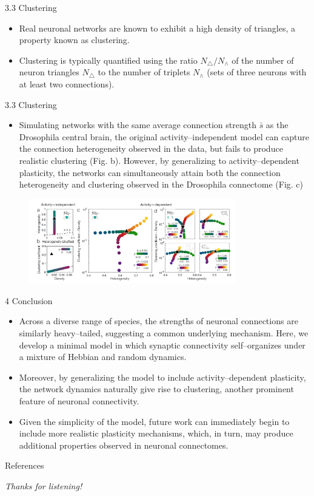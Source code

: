 \documentclass[
  notheorems,
  aspectratio=54,
]{beamer}
\begin{document}
\begin{frame}{3.3 Clustering}
  \begin{itemize}
    \item Real neuronal networks are known to exhibit a high density of triangles, a property known as clustering.
    \item Clustering is typically quantified using the ratio $N_{\triangle}/N_{\wedge}$ of the number of neuron triangles $N_{\triangle}$ to the
number of triplets $N_{\wedge}$ (sets of three neurons with at least two connections).
  \end{itemize}
\end{frame}

\begin{frame}{3.3 Clustering}
  \begin{itemize}
    \item Simulating
      networks with the same average connection strength $\bar{s}$ as the Drosophila central brain, the original
activity–independent model can capture the connection heterogeneity observed in the data, but fails to produce realistic clustering (Fig. b). However,
by generalizing to activity–dependent plasticity, the networks can simultaneously attain both the
connection heterogeneity and clustering observed in the Drosophila connectome (Fig. c)
  \end{itemize}
  \begin{figure}
    \centering
    \includegraphics[width=0.8\textwidth]{./screenshot/10.png}
  \end{figure}
\end{frame}

\begin{frame}{4 Conclusion}
  \begin{itemize}
    \item Across a diverse range of species, the strengths of neuronal connections are similarly heavy–tailed, suggesting a common underlying mechanism. Here, we develop a minimal model
in which synaptic connectivity self–organizes under a mixture of Hebbian and random dynamics.
    \item Moreover, by
generalizing the model to include activity–dependent plasticity, the network dynamics naturally
give rise to clustering, another prominent feature of neuronal connectivity.
    \item Given
the simplicity of the model, future work can immediately begin to include more realistic plasticity
mechanisms, which, in turn, may produce additional properties observed in neuronal connectomes.
  \end{itemize}
\end{frame}


\nocite{*}
\begin{frame}{References}
    \printbibliography
\end{frame}

\begin{frame}{}
  \centering \Huge
  \emph{Thanks for listening!}
\end{frame}
\end{document}
